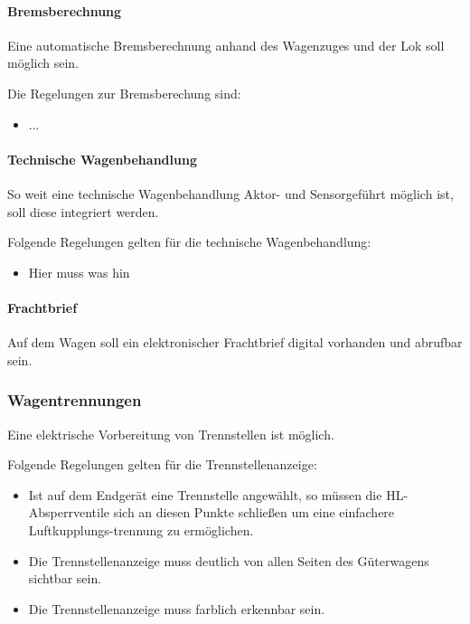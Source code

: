 \paragraph{Bremsberechnung}
\begin{feat}
Eine automatische Bremsberechnung anhand des Wagenzuges und der Lok soll möglich sein.
\end{feat}
\begin{rem}
Die Regelungen zur Bremsberechung sind:
\begin{itemize}
    \item ...
\end{itemize}
\end{rem}

\paragraph{Technische Wagenbehandlung}
\begin{feat}
So weit eine technische Wagenbehandlung Aktor- und Sensorgeführt möglich ist, soll diese integriert werden.
\end{feat}
\begin{feat}
Folgende Regelungen gelten für die technische Wagenbehandlung:
\begin{itemize}
    \item Hier muss was hin
\end{itemize}
\end{feat}

\paragraph{Frachtbrief}
\begin{feat}
Auf dem Wagen soll ein elektronischer Frachtbrief digital vorhanden und abrufbar sein.
\end{feat}

\subsubsection{Wagentrennungen}
\begin{feat}
Eine elektrische Vorbereitung von Trennstellen ist möglich.
\end{feat}
\begin{rem}
Folgende Regelungen gelten für die Trennstellenanzeige:
\begin{itemize}
    \item Ist auf dem Endgerät eine Trennstelle angewählt, so müssen die HL-Absperrventile sich an diesen Punkte schließen um eine einfachere Luftkupplungs-trennung zu ermöglichen.
    \item Die Trennstellenanzeige muss deutlich von allen Seiten des Güterwagens sichtbar sein.
    \item Die Trennstellenanzeige muss farblich erkennbar sein.
\end{itemize}
\end{rem}

